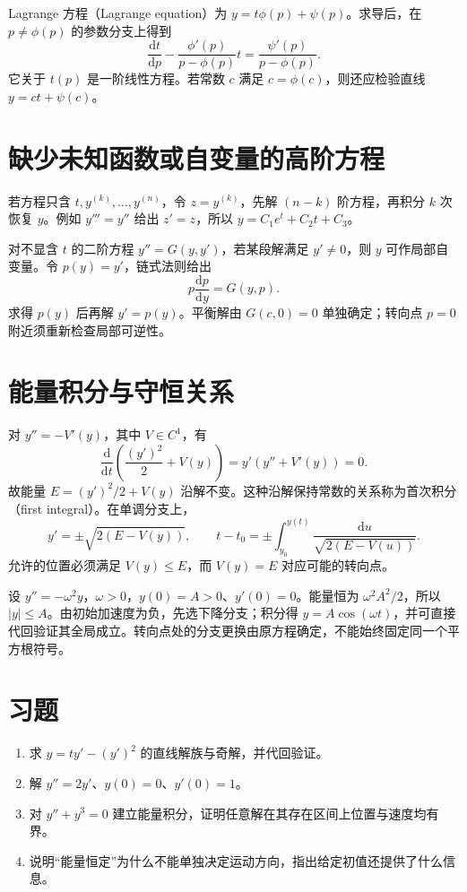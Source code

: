 Lagrange 方程（Lagrange equation）为 $y=t\phi(p)+\psi(p)$。求导后，在 $p\ne\phi(p)$ 的参数分支上得到
\[
 \frac{\mathrm dt}{\mathrm dp}-\frac{\phi'(p)}{p-\phi(p)}t
 =\frac{\psi'(p)}{p-\phi(p)}.
\]
它关于 $t(p)$ 是一阶线性方程。若常数 $c$ 满足 $c=\phi(c)$，则还应检验直线 $y=ct+\psi(c)$。

\section{缺少未知函数或自变量的高阶方程}
若方程只含 $t,y^{(k)},\ldots,y^{(n)}$，令 $z=y^{(k)}$，先解 $(n-k)$ 阶方程，再积分 $k$ 次恢复 $y$。例如 $y'''=y''$ 给出 $z'=z$，所以 $y=C_1e^t+C_2t+C_3$。

对不显含 $t$ 的二阶方程 $y''=G(y,y')$，若某段解满足 $y'\ne0$，则 $y$ 可作局部自变量。令 $p(y)=y'$，链式法则给出
\[
 p\frac{\mathrm dp}{\mathrm dy}=G(y,p).
\]
求得 $p(y)$ 后再解 $y'=p(y)$。平衡解由 $G(c,0)=0$ 单独确定；转向点 $p=0$ 附近须重新检查局部可逆性。

\section{能量积分与守恒关系}
对 $y''=-V'(y)$，其中 $V\in C^1$，有
\begin{equation}
 \frac{\mathrm d}{\mathrm dt}\left(\frac{(y')^2}{2}+V(y)\right)
 =y'(y''+V'(y))=0.
 \label{eq:ode-energy}
\end{equation}
故能量 $E=(y')^2/2+V(y)$ 沿解不变。这种沿解保持常数的关系称为首次积分（first integral）。在单调分支上，
\[
 y'=\pm\sqrt{2(E-V(y))},\qquad
 t-t_0=\pm\int_{y_0}^{y(t)}\frac{\mathrm du}{\sqrt{2(E-V(u))}}.
\]
允许的位置必须满足 $V(y)\leq E$，而 $V(y)=E$ 对应可能的转向点。

\begin{example}
设 $y''=-\omega^2y$，$\omega>0$，$y(0)=A>0$、$y'(0)=0$。能量恒为 $\omega^2A^2/2$，所以 $|y|\leq A$。由初始加速度为负，先选下降分支；积分得 $y=A\cos(\omega t)$，并可直接代回验证其全局成立。转向点处的分支更换由原方程确定，不能始终固定同一个平方根符号。
\end{example}

\section{习题}
\begin{enumerate}
 \item\label{ex:ode-clairaut} 求 $y=ty'-(y')^2$ 的直线解族与奇解，并代回验证。
 \item\label{ex:ode-reduce} 解 $y''=2y'$、$y(0)=0$、$y'(0)=1$。
 \item 对 $y''+y^3=0$ 建立能量积分，证明任意解在其存在区间上位置与速度均有界。
 \item 说明“能量恒定”为什么不能单独决定运动方向，指出给定初值还提供了什么信息。
\end{enumerate}


